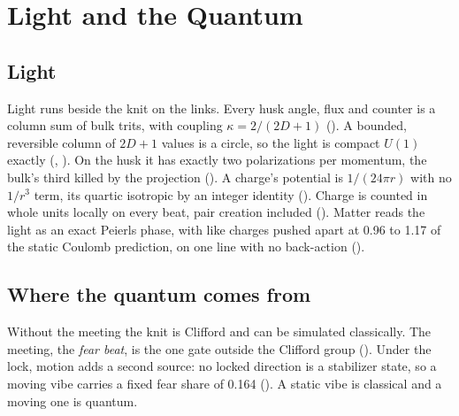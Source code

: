 \section{Light and the Quantum}
\label{sec:light}

\subsection{Light}

Light runs beside the knit on the links. Every husk angle, flux and counter is a column sum of bulk trits, with
coupling $\kappa = 2/(2D + 1)$ (). A bounded, reversible column of $2D + 1$ values is a circle, so
the light is compact $U(1)$ exactly (, ). On the husk it has exactly two
polarizations per momentum, the bulk's third killed by the projection (). A charge's potential is
$1/(24\pi r)$ with no $1/r^3$ term, its quartic isotropic by an integer identity (). Charge is
counted in whole units locally on every beat, pair creation included (). Matter reads the light as an
exact Peierls phase, with like charges pushed apart at 0.96 to 1.17 of the static Coulomb prediction, on one line with
no back-action ().

\subsection{Where the quantum comes from}

Without the meeting the knit is Clifford and can be simulated classically. The meeting, the \emph{fear beat}, is the
one gate outside the Clifford group (). Under the lock, motion adds a second source: no locked
direction is a stabilizer state, so a moving vibe carries a fixed fear share of 0.164 (). A static
vibe is classical and a moving one is quantum.

